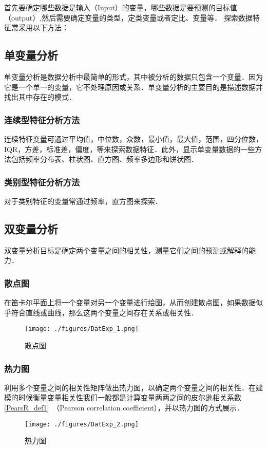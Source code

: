 \begin{issues}
\issueTODO
\end{issues}

首先要确定哪些数据是输入（Input）的变量，哪些数据是要预测的目标值（output）,然后需要确定变量的类型，定类变量或者定比、变量等．
探索数据特征常采用以下方法：
\subsection{单变量分析}
单变量分析是数据分析中最简单的形式，其中被分析的数据只包含一个变量．因为它是一个单一的变量，它不处理原因或关系．单变量分析的主要目的是描述数据并找出其中存在的模式．  
\subsubsection{连续型特征分析方法}
连续特征变量可通过平均值，中位数，众数，最小值，最大值，范围，四分位数，IQR，方差，标准差，偏度，等来探索数据特征．此外，显示单变量数据的一些方法包括频率分布表、柱状图、直方图、频率多边形和饼状图．
\subsubsection{类别型特征分析方法}
对于类别特征的变量常通过频率，直方图来探索．
\subsection{双变量分析}
双变量分析目标是确定两个变量之间的相关性，测量它们之间的预测或解释的能力．
\subsubsection{散点图}
在笛卡尔平面上将一个变量对另一个变量进行绘图，从而创建散点图，如果数据似乎符合直线或曲线，那么这两个变量之间存在关系或相关性．
\begin{figure}[ht]
\centering
\texttt{[image: ./figures/DatExp\_1.png]}
\caption{散点图} \label{DatExp_fig1}
\end{figure}
\subsubsection{热力图}
利用多个变量之间的相关性矩阵做出热力图，以确定两个变量之间的相关性．在建模的时候衡量变量相关性我们一般都是计算变量两两之间的皮尔逊相关系数\autoref{PearsR_def1}~（Pearson correlation coefficient），并以热力图的方式展示．
\begin{figure}[ht]
\centering
\texttt{[image: ./figures/DatExp\_2.png]}
\caption{热力图} \label{DatExp_fig2}
\end{figure}
